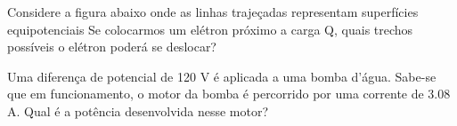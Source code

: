 \documentclass[12pt, addpoints]{exam}
\begin{document}
\begin{questions}
\begin{multicols*}{2}
\begin{oneparchoices}
\end{oneparchoices}
\question[20] Considere a figura abaixo onde as linhas trajeçadas representam superfícies equipotenciais Se colocarmos um elétron próximo a carga Q, quais trechos possíveis o elétron poderá se deslocar?
        
        \begin{center}
            \begin{minipage}[c]{0.5\linewidth}
            \end{minipage}
        \end{center}
        
        

\begin{oneparchoices}
\end{oneparchoices}
\question[20] Uma diferença de potencial de 120 V é aplicada a uma bomba d’água. Sabe-se que em funcionamento, o motor da bomba é percorrido por uma corrente de    3.08 A. Qual é a potência desenvolvida nesse motor?


\end{multicols*}
\end{questions}
\end{document}
